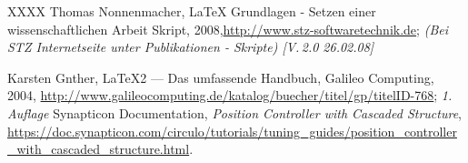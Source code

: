 \begin{thebibliography}{XXXX}
 Thomas Nonnenmacher, LaTeX Grundlagen - Setzen einer wissenschaftlichen Arbeit Skript, 2008,\url{http://www.stz-softwaretechnik.de}; \textit{(Bei STZ Internetseite unter Publikationen - Skripte) [V.\,2.0 26.02.08]}

 Karsten Gnther, LaTeX2 --- Das umfassende Handbuch, Galileo Computing, 2004, \url{http://www.galileocomputing.de/katalog/buecher/titel/gp/titelID-768}; \textit{1. Auflage}
 Synapticon Documentation, \textit{Position Controller with Cascaded Structure}, \url{https://doc.synapticon.com/circulo/tutorials/tuning_guides/position_controller_with_cascaded_structure.html}.
\end{thebibliography}
